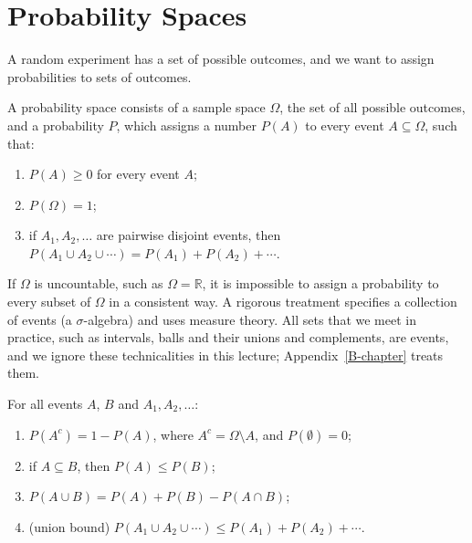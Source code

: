 \section{Probability Spaces}\label{L4-sec:probability}

A random experiment has a set of possible outcomes, and we want to assign probabilities to sets of outcomes.

\begin{definition}\label{L4-def:probability}
    A probability space consists of a sample space $\Omega$, the set of all possible outcomes, and a probability $P$, which assigns a number $P(A)$ to every event $A \subseteq \Omega$, such that:
    \begin{enumerate}
        \item $P(A) \geq 0$ for every event $A$;
        \item $P(\Omega) = 1$;
        \item if $A_1, A_2, \ldots$ are pairwise disjoint events, then $P(A_1 \cup A_2 \cup \cdots) = P(A_1) + P(A_2) + \cdots$.
    \end{enumerate}
\end{definition}

\begin{remark}\label{L4-rem:measure-theory}
    If $\Omega$ is uncountable, such as $\Omega = \mathbb{R}$, it is impossible to assign a probability to every subset of $\Omega$ in a consistent way. A rigorous treatment specifies a collection of events (a $\sigma$-algebra) and uses measure theory. All sets that we meet in practice, such as intervals, balls and their unions and complements, are events, and we ignore these technicalities in this lecture; Appendix~\ref{B-chapter} treats them.
\end{remark}

\begin{proposition}\label{L4-prop:probability-rules}
    For all events $A$, $B$ and $A_1, A_2, \ldots$:
    \begin{enumerate}
        \item $P(A^c) = 1 - P(A)$, where $A^c = \Omega \setminus A$, and $P(\emptyset) = 0$;
        \item if $A \subseteq B$, then $P(A) \leq P(B)$;
        \item $P(A \cup B) = P(A) + P(B) - P(A \cap B)$;
        \item (union bound) $P(A_1 \cup A_2 \cup \cdots) \leq P(A_1) + P(A_2) + \cdots$.
    \end{enumerate}
\end{proposition}

